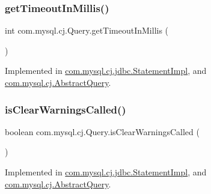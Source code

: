 \subsubsection{\texorpdfstring{get\+Timeout\+In\+Millis()}{getTimeoutInMillis()}}
{\footnotesize\ttfamily int com.\+mysql.\+cj.\+Query.\+get\+Timeout\+In\+Millis (\begin{DoxyParamCaption}{ }\end{DoxyParamCaption})}



Implemented in \mbox{\hyperlink{classcom_1_1mysql_1_1cj_1_1jdbc_1_1_statement_impl_ae819d62406476bbeb71be402eff8f619}{com.\+mysql.\+cj.\+jdbc.\+Statement\+Impl}}, and \mbox{\hyperlink{classcom_1_1mysql_1_1cj_1_1_abstract_query_a4ff067e743c86f5349676c6bddc26eab}{com.\+mysql.\+cj.\+Abstract\+Query}}.

\mbox{\label{interfacecom_1_1mysql_1_1cj_1_1_query_af3f72d084a40a8ec805f10b75b8fa0f2}} 
\subsubsection{\texorpdfstring{is\+Clear\+Warnings\+Called()}{isClearWarningsCalled()}}
{\footnotesize\ttfamily boolean com.\+mysql.\+cj.\+Query.\+is\+Clear\+Warnings\+Called (\begin{DoxyParamCaption}{ }\end{DoxyParamCaption})}



Implemented in \mbox{\hyperlink{classcom_1_1mysql_1_1cj_1_1jdbc_1_1_statement_impl_a63d97344f6b1ebede1e07b71d13a923d}{com.\+mysql.\+cj.\+jdbc.\+Statement\+Impl}}, and \mbox{\hyperlink{classcom_1_1mysql_1_1cj_1_1_abstract_query_a27bdd1ed787ed128edbbd307731e8120}{com.\+mysql.\+cj.\+Abstract\+Query}}.

\mbox{\label{interfacecom_1_1mysql_1_1cj_1_1_query_a382965ca9799730bbfd58c83facd98b5}} 
